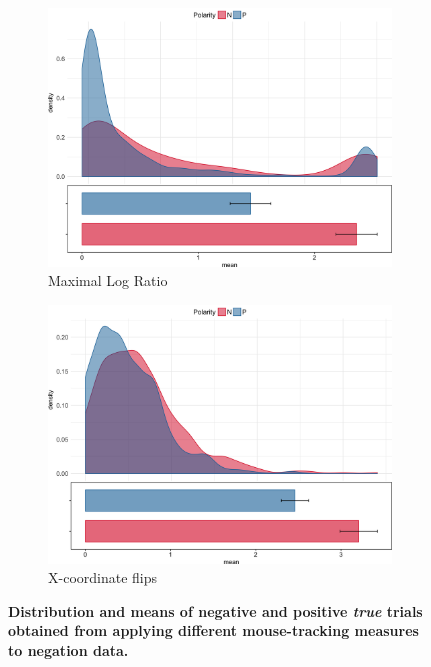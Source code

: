 \documentclass{article}
\begin{document}
\begin{figure}
%
\begin{subfigure}[b]{0.4\textwidth}
\includegraphics[width=\textwidth]{MaxRatio_negation.png}
\caption{Maximal Log Ratio}
\end{subfigure}
%
\begin{subfigure}[b]{0.4\textwidth}
\includegraphics[width=\textwidth]{Xflips_negation.png}
\caption{X-coordinate flips}
\end{subfigure}

\caption{\textbf{Distribution and means of negative and positive \emph{true} trials obtained from applying different mouse-tracking measures to negation data.}}
\label{fig:different.measures_negation}
\end{figure}
\end{document}
